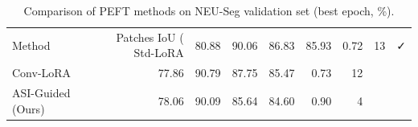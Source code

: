\begin{table}[t]
\centering
\caption{Comparison of PEFT methods on NEU-Seg validation set (best epoch, \%).}
\label{tab:main}
\small
\begin{tabular}{lrrrrrrr}
\toprule
Method & Patches IoU (%
\midrule
Std-LoRA & 80.88 & 90.06 & 86.83 & 85.93 & 0.72 & 13 & ✓ \\
Conv-LoRA & 77.86 & 90.79 & 87.75 & 85.47 & 0.73 & 12 &  \\
ASI-Guided (Ours) & 78.06 & 90.09 & 85.64 & 84.60 & 0.90 & 4 &  \\
\bottomrule
\end{tabular}
\end{table}